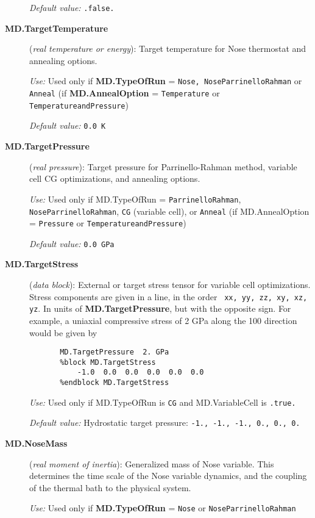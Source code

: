 \begin{description}
{\it Default value:} {\tt .false.}

\item[{\bf MD.TargetTemperature}] ({\it real temperature or energy}): 
Target temperature for Nose thermostat and annealing options.

{\it Use:} Used only if {\bf MD.TypeOfRun} = {\tt Nose, NoseParrinelloRahman}
or {\tt Anneal} (if {\bf MD.AnnealOption} = {\tt Temperature} or 
{\tt TemperatureandPressure})

{\it Default value:} {\tt 0.0 K}

\item[{\bf MD.TargetPressure}] ({\it real pressure}): 
Target pressure for Parrinello-Rahman method, variable cell CG optimizations,
and annealing options.

{\it Use:} Used only if MD.TypeOfRun = 
{\tt ParrinelloRahman}, {\tt NoseParrinelloRahman},
{\tt CG} (variable cell), or {\tt Anneal} 
(if MD.AnnealOption = {\tt Pressure} or {\tt TemperatureandPressure})

{\it Default value:} {\tt 0.0 GPa}


\item[{\bf MD.TargetStress}] ({\it data block}):
External or target stress tensor for variable cell optimizations.
Stress components are given in a line, in the order {\tt
xx, yy, zz, xy, xz, yz}. In units of {\bf MD.TargetPressure},
but with the opposite sign. For example, a uniaxial compressive stress 
of 2 GPa along the 100 direction would be given by
\begin{verbatim}
       MD.TargetPressure  2. GPa
       %block MD.TargetStress
           -1.0  0.0  0.0  0.0  0.0  0.0
       %endblock MD.TargetStress
\end{verbatim}

{\it Use:} Used only if MD.TypeOfRun is {\tt CG} and 
MD.VariableCell is {\tt .true.} 
 
{\it Default value:} Hydrostatic target pressure: 
{\tt -1., -1., -1., 0., 0., 0.}



\item[{\bf MD.NoseMass}] ({\it real moment of inertia}): 
Generalized mass of Nose variable.
This determines the time scale of the Nose variable
dynamics, and the coupling of the thermal bath to
the physical system.

{\it Use:} Used only if {\bf MD.TypeOfRun} = {\tt Nose} or 
{\tt NoseParrinelloRahman}


\end{description}
